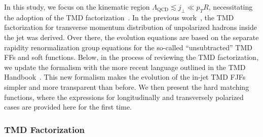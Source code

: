 \documentclass[a4paper, 11 pt]{article}
\begin{document}
In this study, we focus on the kinematic region $\Lambda _{\mathrm{QCD}} \lesssim j_{\perp} \ll p_T R$, necessitating the adoption of the TMD factorization~\cite{Collins:2011zzd}. In the previous work~\cite{Kang:2017glf}, the TMD factorization for transverse momentum distribution of unpolarized hadrons inside the jet was derived. Over there, the evolution equations are based on the separate rapidity renormalization group equations for the so-called ``unsubtracted'' TMD FFs and soft functions. Below, in the process of reviewing the TMD factorization, we update the formalism with the more recent language outlined in the TMD Handbook~\cite{Boussarie:2023izj}. This new formalism makes the evolution of the in-jet TMD FJFs simpler and more transparent than before. We then present the hard matching functions, where the expressions for longitudinally and transversely polarized cases are provided here for the first time.

\subsubsection{TMD Factorization}
\end{document}
